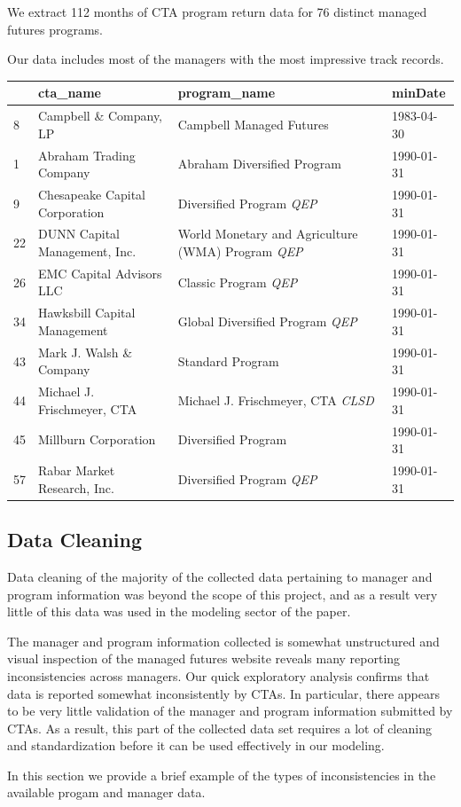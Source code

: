 \documentclass[]{article}
\begin{document}
We extract 112 months of CTA program return data for 76 distinct managed
futures programs.

Our data includes most of the managers with the most impressive track
records.

\begin{longtable}[c]{@{}llll@{}}
\toprule
& cta\_name & program\_name & minDate\tabularnewline
\midrule
\endhead
8 & Campbell \& Company, LP & Campbell Managed Futures &
1983-04-30\tabularnewline
1 & Abraham Trading Company & Abraham Diversified Program &
1990-01-31\tabularnewline
9 & Chesapeake Capital Corporation & Diversified Program \emph{QEP} &
1990-01-31\tabularnewline
22 & DUNN Capital Management, Inc. & World Monetary and Agriculture
(WMA) Program \emph{QEP} & 1990-01-31\tabularnewline
26 & EMC Capital Advisors LLC & Classic Program \emph{QEP} &
1990-01-31\tabularnewline
34 & Hawksbill Capital Management & Global Diversified Program
\emph{QEP} & 1990-01-31\tabularnewline
43 & Mark J. Walsh \& Company & Standard Program &
1990-01-31\tabularnewline
44 & Michael J. Frischmeyer, CTA & Michael J. Frischmeyer, CTA
\emph{CLSD} & 1990-01-31\tabularnewline
45 & Millburn Corporation & Diversified Program &
1990-01-31\tabularnewline
57 & Rabar Market Research, Inc. & Diversified Program \emph{QEP} &
1990-01-31\tabularnewline
\bottomrule
\end{longtable}

\subsection{Data Cleaning}\label{data-cleaning}

Data cleaning of the majority of the collected data pertaining to
manager and program information was beyond the scope of this project,
and as a result very little of this data was used in the modeling sector
of the paper.

The manager and program information collected is somewhat unstructured
and visual inspection of the managed futures website reveals many
reporting inconsistencies across managers. Our quick exploratory
analysis confirms that data is reported somewhat inconsistently by CTAs.
In particular, there appears to be very little validation of the manager
and program information submitted by CTAs. As a result, this part of the
collected data set requires a lot of cleaning and standardization before
it can be used effectively in our modeling.

In this section we provide a brief example of the types of
inconsistencies in the available progam and manager data.
\end{document}
